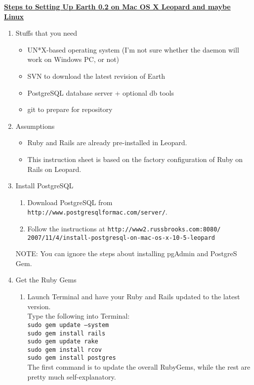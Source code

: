 \documentclass{letter}
\begin{document}
{\large \textbf{\underline{Steps to Setting Up Earth 0.2 on Mac OS X Leopard and maybe Linux}}}\\

\begin{enumerate}
\item Stuffs that you need
	\begin{itemize}
	\item UN*X-based operating system (I'm not sure whether the daemon will work on Windows PC, or not)
	\item SVN to download the latest revision of Earth
	\item PostgreSQL database server + optional db tools
	\item git to prepare for repository
	\end{itemize}
\item Assumptions
	\begin{itemize}
	\item Ruby and Rails are already pre-installed in Leopard. 
	\item This instruction sheet is based on the factory configuration of Ruby on Rails on Leopard. 
	\end{itemize}
\item Install PostgreSQL
	\begin{enumerate}
	\item Download PostgreSQL from {\tt http://www.postgresqlformac.com/server/}. 
	\item Follow the instructions at {\tt http://www2.russbrooks.com:8080/ \\ 2007/11/4/install-postgresql-on-mac-os-x-10-5-leopard}
	\end{enumerate}
	NOTE: You can ignore the steps about installing pgAdmin and PostgreS Gem. 
\item Get the Ruby Gems
	\begin{enumerate}
	\item Launch Terminal and have your Ruby and Rails updated to the latest version. \\ 
	Type the following into Terminal: \\
	{\tt sudo gem update --system}  \\ 
	{\tt sudo gem install rails} \\ 
	{\tt sudo gem update rake} \\
	{\tt sudo gem install rcov} \\
	{\tt sudo gem install postgres} \\ 
	The first command is to update the overall RubyGems, while the rest are pretty much self-explanatory. 

\end{enumerate}
\end{enumerate}
\end{document}
